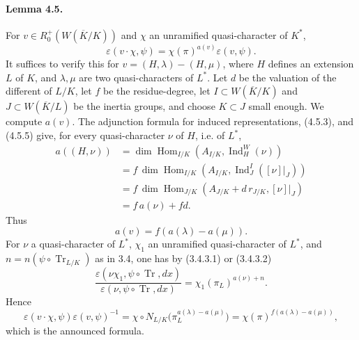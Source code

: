 \documentclass[10pt,letterpaper]{article}
\newcommand{\Hom}{\operatorname{Hom}}
\newcommand{\Ind}{\operatorname{Ind}}
\newcommand{\Tr}{\operatorname{Tr}}
\providecommand{\Hom}{\operatorname{Hom}}
\providecommand{\Hom}{\operatorname{Hom}}
\providecommand{\Tr}{\operatorname{Tr}}
\providecommand{\Hom}{\operatorname{Hom}}
\providecommand{\Tr}{\operatorname{Tr}}
\providecommand{\Tr}{\operatorname{Tr}}
\providecommand{\Ind}{\operatorname{Ind}}
\begin{document}
\paragraph{Lemma 4.5.} For \(v\in R^+_0(W(\overline K/K))\) and \(\chi\) an unramified quasi-character of \(K^*\),
\[
\varepsilon(v\cdot\chi,\psi)=\chi(\pi)^{a(v)}\varepsilon(v,\psi).
\]
It suffices to verify this for \(v=(H,\lambda)-(H,\mu)\), where \(H\) defines an extension \(L\) of \(K\), and \(\lambda,\mu\) are two quasi-characters of \(L^*\). Let \(d\) be the valuation of the different of \(L/K\), let \(f\) be the residue-degree, let \(I\subset W(\overline K/K)\) and \(J\subset W(\overline K/L)\) be the inertia groups, and choose \(K\subset J\) small enough. We compute \(a(v)\). The adjunction formula for induced representations, (4.5.3), and (4.5.5) give, for every quasi-character \(\nu\) of \(H\), i.e. of \(L^*\),
\[
\tag{4.5.1'}
\begin{aligned}
a((H,\nu))
&=\dim\Hom_{I/K}(A_{I/K},\Ind_H^W(\nu))\\
&=f\,\dim\Hom_{I/K}(A_{I/K},\Ind_J^I([\nu]|_J))\\
&=f\,\dim\Hom_{J/K}(A_{J/K}+d\,r_{J/K},[\nu]|_J)\\
&=f\,a(\nu)+fd.
\end{aligned}
\]
Thus
\[
a(v)=f(a(\lambda)-a(\mu)).
\]
For \(\nu\) a quasi-character of \(L^*\), \(\chi_1\) an unramified quasi-character of \(L^*\), and \(n=n(\psi\circ\Tr_{L/K})\) as in 3.4, one has by (3.4.3.1) or (3.4.3.2)
\[
\frac{\varepsilon(\nu\chi_1,\psi\circ\Tr,dx)}
     {\varepsilon(\nu,\psi\circ\Tr,dx)}
=
\chi_1(\pi_L)^{a(\nu)+n}.
\]
Hence
\[
\varepsilon(v\cdot\chi,\psi)\varepsilon(v,\psi)^{-1}
=
\chi\circ N_{L/K}\bigl(\pi_L^{a(\lambda)-a(\mu)}\bigr)
=
\chi(\pi)^{f(a(\lambda)-a(\mu))},
\]
which is the announced formula.
\end{document}
